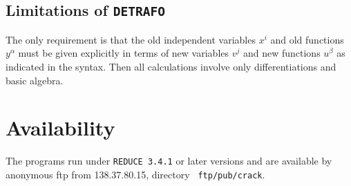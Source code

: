\subsection{Limitations of {\tt DETRAFO}}
The only requirement is that
the old independent variables $x^i$ and old functions $y^\alpha$ must be
given explicitly in terms of new variables $v^j$ and new functions $u^\beta$
as indicated in the syntax.
Then all calculations involve only differentiations and basic algebra.
\section{Availability}
The programs run under {\tt REDUCE 3.4.1} or later versions and are available
by anonymous ftp from 138.37.80.15, directory {\tt ~ftp/pub/crack}.

